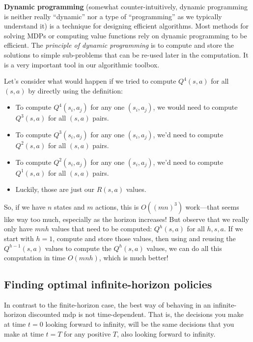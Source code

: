 \begin{examplebox} {\bf Dynamic programming}
  (somewhat counter-intuitively, dynamic programming is neither really
  ``dynamic'' nor a type of ``programming'' as we typically understand
  it) is a technique for designing efficient algorithms.  Most methods
  for solving MDPs or computing value functions rely on dynamic
  programming to be efficient.  The {\em principle of dynamic
      programming} is to compute and store
  the solutions to simple sub-problems that can be re-used later in
  the computation.  It is a very important tool in our algorithmic
  toolbox.

  Let's consider what would happen if we tried to compute $Q^4(s,
    a)$ for all $(s, a)$ by directly using the definition:
  \begin{itemize}
    \item To compute $Q^4(s_i, a_j)$ for any one $(s_i, a_j)$, we would
          need to compute $Q^3(s, a)$ for all $(s, a)$
          pairs.
    \item To compute $Q^3(s_i, a_j)$ for any one $(s_i, a_j)$, we'd need to
          compute $Q^2(s, a)$ for all $(s, a)$ pairs.
    \item To compute $Q^2(s_i, a_j)$ for any one $(s_i, a_j)$, we'd
          need to compute $Q^1(s, a)$ for all $(s, a)$ pairs.
    \item Luckily, those are just our $R(s, a)$ values.
  \end{itemize}

  So, if we have $n$ states and $m$ actions, this is $O((mn)^3)$
  work---that seems like way too much, especially as the horizon
  increases!  But observe that we really only have $mnh$ values that
  need to be computed: $Q^h(s, a)$ for all $h, s, a$.  If we start with
  $h=1$, compute and store those values, then using and reusing the
  $Q^{h-1}(s, a)$ values to compute the $Q^h(s, a)$ values, we can do
  all this computation in time $O(mnh)$, which is much better!

\end{examplebox}

\subsection{Finding optimal infinite-horizon policies}
\label{sec-mdp_infinite_horizon_optimal}

In contrast to the finite-horizon case, the best way of behaving in an
infinite-horizon discounted {\sc mdp} is not time-dependent. That is,
the decisions you make at time $t = 0$ looking forward to infinity,
will be the same decisions that you make at time $t = T$ for any positive
$T$, also looking forward to infinity.

